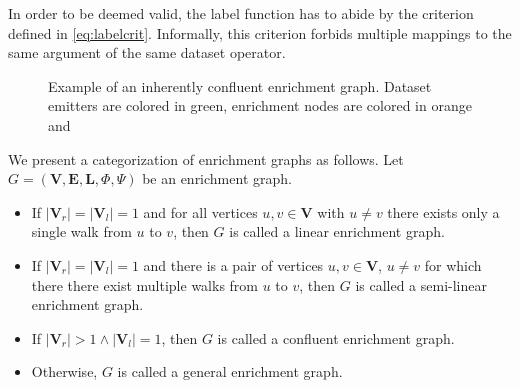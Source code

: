 In order to be deemed valid, the label function has to abide by the criterion defined in \autoref{eq:labelcrit}.
Informally, this criterion forbids multiple mappings to the same argument of the same dataset operator.

\begin{figure}[tb]
\centering
\caption[Example of an inherently confluent enrichment graph]{Example of an inherently confluent enrichment graph. Dataset emitters are colored in green, enrichment nodes are colored in orange and }
\label{fig:exampleenrichmentgraph}
\end{figure}

We present a categorization of enrichment graphs as follows. Let $G=(\mathbf{V},\mathbf{E},\mathbf{L},\Phi,\Psi)$ be an enrichment graph.

\begin{itemize}
  \item If $|\mathbf{V}_r|=|\mathbf{V}_l|=1$ and for all vertices $u,v\in\mathbf{V}$ with $u\neq v$ there exists only a single walk from $u$ to $v$, then $G$ is called a linear enrichment graph.
  \item If $|\mathbf{V}_r|=|\mathbf{V}_l|=1$ and there is a pair of vertices $u,v\in\mathbf{V}$,  $u\neq v$ for which there there exist multiple walks from $u$ to $v$, then $G$ is called a semi-linear enrichment graph.
  \item If $|\mathbf{V}_r|>1 \land |\mathbf{V}_l|=1$, then $G$ is called a confluent enrichment graph.
  \item Otherwise, $G$ is called a general enrichment graph.
\end{itemize}

